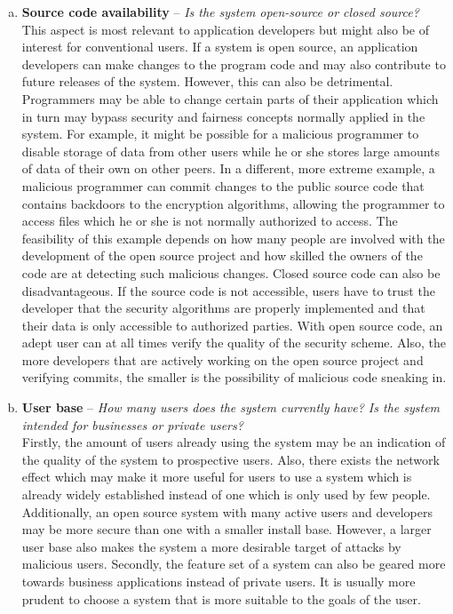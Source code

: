 \begin{enumerate}[(a)]
\item \textbf{Source code availability} -- \textit{Is the system open-source or closed source?}\\
This aspect is most relevant to application developers but might also be of interest for conventional users. If a system is open source, an application developers can make changes to the program code and may also contribute to future releases of the system. However, this can also be detrimental. Programmers may be able to change certain parts of their application which in turn may bypass security and fairness concepts normally applied in the system. For example, it might be possible for a malicious programmer to disable storage of data from other users while he or she stores large amounts of data of their own on other peers. In a different, more extreme example, a malicious programmer can commit changes to the public source code that contains backdoors to the encryption algorithms, allowing the programmer to access files which he or she is not normally authorized to access. The feasibility of this example depends on how many people are involved with the development of the open source project and how skilled the owners of the code are at detecting such malicious changes.
Closed source code can also be disadvantageous. If the source code is not accessible, users have to trust the developer that the security algorithms are properly implemented and that their data is only accessible to authorized parties. With open source code, an adept user can at all times verify the quality of the security scheme. Also, the more developers that are actively working on the open source project and verifying commits, the smaller is the possibility of malicious code sneaking in.

\item \textbf{User base} -- \textit{How many users does the system currently have? Is the system intended for businesses or private users?}\\
Firstly, the amount of users already using the system may be an indication of the quality of the system to prospective users. Also, there exists the network effect which may make it more useful for users to use a system which is already widely established instead of one which is only used by few people. Additionally, an open source system with many active users and developers may be more secure than one with a smaller install base. However, a larger user base also makes the system a more desirable target of attacks by malicious users. Secondly, the feature set of a system can also be geared more towards business applications instead of private users. It is usually more prudent to choose a system that is more suitable to the goals of the user.


\end{enumerate}
